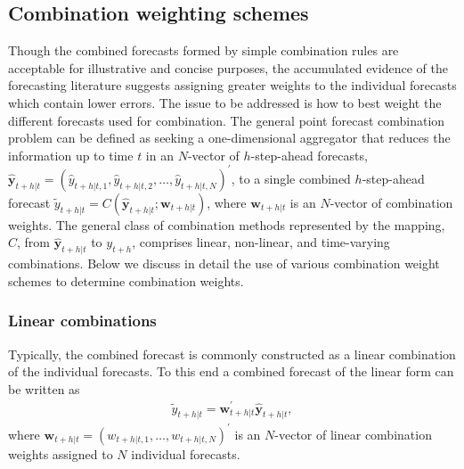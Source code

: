 \documentclass[11pt]{article}
\begin{document}
\subsection{Combination weighting schemes}



Though the combined forecasts formed by simple combination rules are acceptable for illustrative and concise purposes, the accumulated evidence of the forecasting literature suggests assigning greater weights to the individual forecasts which contain lower errors. The issue to be addressed is how to best weight the different forecasts used for combination. The general point forecast combination problem can be defined as seeking a one-dimensional aggregator that reduces the information up to time $t$ in an $N$-vector of $h$-step-ahead forecasts, $\hat{\mathbf{y}}_{t+h|t}=\left(\hat{y}_{t+h|t, 1}, \hat{y}_{t+h|t, 2}, \ldots, \hat{y}_{t+h|t, N}\right)^{\prime}$, to a single combined $h$-step-ahead forecast $\tilde{y}_{t+h|t}=C\left(\hat{\mathbf{y}}_{t+h|t} ; \boldsymbol{w}_{t+h|t}\right)$, where $\boldsymbol{w}_{t+h|t}$ is an $N$-vector of combination weights. The general class of combination methods represented by the mapping, $C$, from $\hat{\mathbf{y}}_{t+h|t}$ to $y_{t+h}$, comprises linear, non-linear, and time-varying combinations. Below we discuss in detail the use of various combination weight schemes to determine combination weights.

\subsubsection{Linear combinations}

Typically, the combined forecast is commonly constructed as a linear combination of the individual forecasts. To this end a combined forecast of the linear form can be written as
\begin{align}
\label{eq:linear-combinations}
\tilde{y}_{t+h|t}=\boldsymbol{w}_{t+h|t}^{\prime} \hat{\mathbf{y}}_{t+h|t},
\end{align}
where $\boldsymbol{w}_{t+h|t}=\left(w_{t+h|t, 1}, \ldots, w_{t+h|t, N}\right)^{\prime}$ is an $N$-vector of linear combination weights assigned to $N$ individual forecasts.
\end{document}
